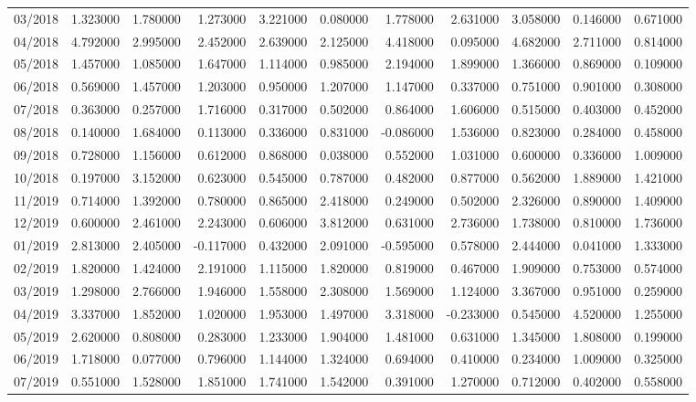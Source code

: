 \begin{tabular}{lrrrrrrrrrr}
03/2018 & 1.323000 & 1.780000 & 1.273000 & 3.221000 & 0.080000 & 1.778000 & 2.631000 & 3.058000 & 0.146000 & 0.671000 \\
04/2018 & 4.792000 & 2.995000 & 2.452000 & 2.639000 & 2.125000 & 4.418000 & 0.095000 & 4.682000 & 2.711000 & 0.814000 \\
05/2018 & 1.457000 & 1.085000 & 1.647000 & 1.114000 & 0.985000 & 2.194000 & 1.899000 & 1.366000 & 0.869000 & 0.109000 \\
06/2018 & 0.569000 & 1.457000 & 1.203000 & 0.950000 & 1.207000 & 1.147000 & 0.337000 & 0.751000 & 0.901000 & 0.308000 \\
07/2018 & 0.363000 & 0.257000 & 1.716000 & 0.317000 & 0.502000 & 0.864000 & 1.606000 & 0.515000 & 0.403000 & 0.452000 \\
08/2018 & 0.140000 & 1.684000 & 0.113000 & 0.336000 & 0.831000 & -0.086000 & 1.536000 & 0.823000 & 0.284000 & 0.458000 \\
09/2018 & 0.728000 & 1.156000 & 0.612000 & 0.868000 & 0.038000 & 0.552000 & 1.031000 & 0.600000 & 0.336000 & 1.009000 \\
10/2018 & 0.197000 & 3.152000 & 0.623000 & 0.545000 & 0.787000 & 0.482000 & 0.877000 & 0.562000 & 1.889000 & 1.421000 \\
11/2019 & 0.714000 & 1.392000 & 0.780000 & 0.865000 & 2.418000 & 0.249000 & 0.502000 & 2.326000 & 0.890000 & 1.409000 \\
12/2019 & 0.600000 & 2.461000 & 2.243000 & 0.606000 & 3.812000 & 0.631000 & 2.736000 & 1.738000 & 0.810000 & 1.736000 \\
01/2019 & 2.813000 & 2.405000 & -0.117000 & 0.432000 & 2.091000 & -0.595000 & 0.578000 & 2.444000 & 0.041000 & 1.333000 \\
02/2019 & 1.820000 & 1.424000 & 2.191000 & 1.115000 & 1.820000 & 0.819000 & 0.467000 & 1.909000 & 0.753000 & 0.574000 \\
03/2019 & 1.298000 & 2.766000 & 1.946000 & 1.558000 & 2.308000 & 1.569000 & 1.124000 & 3.367000 & 0.951000 & 0.259000 \\
04/2019 & 3.337000 & 1.852000 & 1.020000 & 1.953000 & 1.497000 & 3.318000 & -0.233000 & 0.545000 & 4.520000 & 1.255000 \\
05/2019 & 2.620000 & 0.808000 & 0.283000 & 1.233000 & 1.904000 & 1.481000 & 0.631000 & 1.345000 & 1.808000 & 0.199000 \\
06/2019 & 1.718000 & 0.077000 & 0.796000 & 1.144000 & 1.324000 & 0.694000 & 0.410000 & 0.234000 & 1.009000 & 0.325000 \\
07/2019 & 0.551000 & 1.528000 & 1.851000 & 1.741000 & 1.542000 & 0.391000 & 1.270000 & 0.712000 & 0.402000 & 0.558000 \\

\end{tabular}
